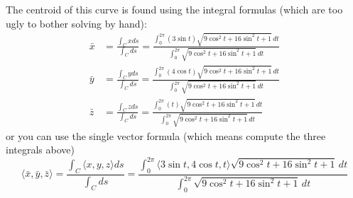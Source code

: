 The centroid of this curve is found using the integral formulas (which
are too ugly to bother solving by hand):
\begin{align*}
\bar x &= \frac{\int_C x ds}{\int_C ds} = \frac{\int_{0}^{2\pi}(3\sin
t)\sqrt{9\cos^2 t+16\sin^2 t+1}\,dt}{\int_{0}^{2\pi}\sqrt{9\cos^2 t+16\sin^2
t+1}\,dt}\\
\bar y &= \frac{\int_C y ds}{\int_C ds} = \frac{\int_{0}^{2\pi}(4\cos
t)\sqrt{9\cos^2 t+16\sin^2 t+1}\,dt}{\int_{0}^{2\pi}\sqrt{9\cos^2 t+16\sin^2
t+1}\,dt}\\
\bar z &= \frac{\int_C z ds}{\int_C ds} = \frac{\int_{0}^{2\pi}(t)\sqrt{9\cos^2
t+16\sin^2 t+1}\,dt}{\int_{0}^{2\pi}\sqrt{9\cos^2 t+16\sin^2 t+1}\,dt}
\end{align*}
or you can use the single vector formula (which means compute the
three integrals above) 
$$\langle\bar x,\bar y,\bar z\rangle = \frac{\int_C \langle x,y,z\rangle
ds}{\int_C ds} = \frac{\int_{0}^{2\pi} \langle3\sin t, 4\cos t,
t\rangle\sqrt{9\cos^2 t+16\sin^2 t+1}\,dt}{\int_{0}^{2\pi}\sqrt{9\cos^2
t+16\sin^2 t+1}\,dt}$$

